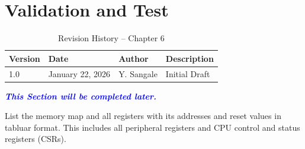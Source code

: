 \chapter{Validation and Test}

\begin{table}[H]
\caption{Revision History – Chapter 6}
\centering
\begin{tabular}{llll}
\toprule
Version & Date & Author & Description \\
\midrule
1.0 & January 22, 2026 & Y. Sangale & Initial Draft \\
\bottomrule
\end{tabular}
\end{table}

\textcolor{blue}{\textbf{\textit{This Section will be completed later.}}}

List the memory map and all registers with its addresses and reset values in tabluar format. This includes all peripheral registers and CPU control and status registers (CSRs).

